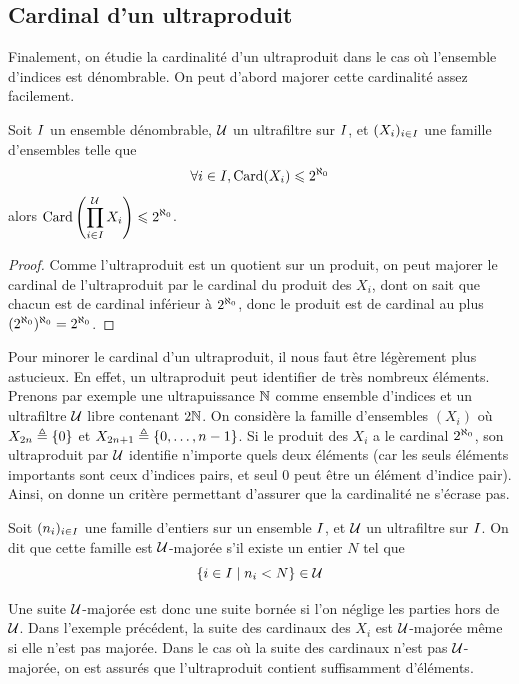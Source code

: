 \subsection{Cardinal d'un ultraproduit}

Finalement, on étudie la cardinalité d'un ultraproduit dans le cas où l'ensemble
d'indices est dénombrable. On peut d'abord majorer cette cardinalité assez
facilement.

\begin{lemma}\label{lem.card.ultra.maj}
  Soit $I$ un ensemble dénombrable, $\mathcal{U}$ un ultrafiltre sur
  $I$, et $(X_i)_{i \in I}$ une famille d'ensembles telle que
  \[\forall i \in I, \operatorname{Card}(X_i) \leqslant 2^{\aleph_0}\]
  alors
  $\displaystyle\operatorname{Card}\left(\prod_{i \in I}^{\mathcal{U}} X_i\right)\leqslant 2^{\aleph_0}$.
\end{lemma}

\begin{proof}
  Comme l'ultraproduit est un quotient sur un produit, on peut majorer le
  cardinal de l'ultraproduit par le cardinal du produit des $X_i$, dont on sait
  que chacun est de cardinal inférieur à $2^{\aleph_0}$, donc le produit est de
  cardinal au plus $(2^{\aleph_0})^{\aleph_0} = 2^{\aleph_0}$.
\end{proof}

Pour minorer le cardinal d'un ultraproduit, il nous faut être légèrement plus
astucieux. En effet, un ultraproduit peut identifier de très nombreux
éléments. Prenons par exemple une ultrapuissance $\mathbb N$ comme ensemble d'indices
et un ultrafiltre $\mathcal{U}$ libre contenant $2\mathbb N$. On considère la famille
d'ensembles $(X_i)$ où $X_{2n} \triangleq \{0\}$ et $X_{2n+1} \triangleq \{0,\ldots,n - 1\}$.
Si le produit des $X_i$ a le cardinal $2^{\aleph_0}$, son ultraproduit par $\mathcal{U}$
identifie n'importe quels deux éléments (car les seuls éléments importants sont
ceux d'indices pairs, et seul $0$ peut être un élément d'indice pair). Ainsi,
on donne un critère permettant d'assurer que la cardinalité ne s'écrase pas.

\begin{definition}
  Soit $(n_i)_{i \in I}$ une famille d'entiers sur un ensemble $I$, et
  $\mathcal{U}$ un ultrafiltre sur $I$. On dit que cette famille est
  $\mathcal{U}$-majorée s'il existe un entier $N$ tel que
  \[\left\{ i \in I \;\middle\vert\; n_i < N \right\} \in \mathcal{U}\]
\end{definition}

Une suite $\mathcal{U}$-majorée est donc une suite bornée si l'on néglige les
parties hors de $\mathcal{U}$. Dans l'exemple précédent, la suite des cardinaux des
$X_i$ est $\mathcal{U}$-majorée même si elle n'est pas majorée. Dans le cas où la
suite des cardinaux n'est pas $\mathcal{U}$-majorée, on est assurés que
l'ultraproduit contient suffisamment d'éléments.

